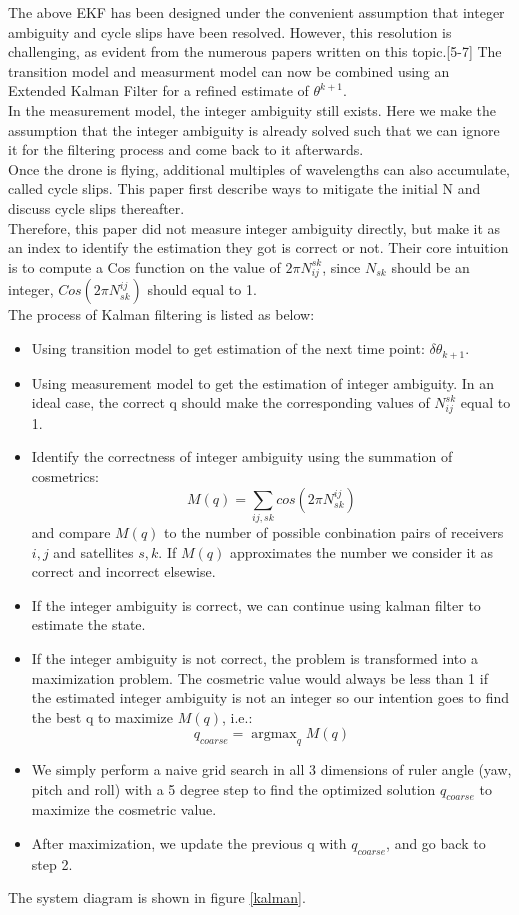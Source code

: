 \documentclass[journal,onecolumn]{IEEEtran}
\DeclareMathOperator*{\argmax}{argmax} %
\begin{document}
The above EKF has been designed under the convenient assumption that integer ambiguity and cycle slips have been resolved.
However, this resolution is challenging, as evident from the numerous papers written on this topic.[5-7]
The transition model and measurment model can now be combined using an
Extended Kalman Filter for a refined estimate of $\theta^{k+1}$.\\
In the measurement model, the integer ambiguity still exists.
Here we make the assumption that the integer ambiguity is already solved
such that we can ignore it for the filtering process and come back to it afterwards.\\
Once the drone is flying, additional multiples of wavelengths can also accumulate,
called cycle slips. This paper first describe ways to mitigate the initial N and
discuss cycle slips thereafter.\\
Therefore, this paper did not measure integer ambiguity directly, but make it as an index
to identify the estimation they got is correct or not. Their core intuition is
to compute a Cos function on the value of $2\pi N_{ij}^{sk}$,
since $N_{sk}$ should be an integer, $Cos(2\pi N_{sk}^{ij})$ should equal to 1.\\
The process of Kalman filtering is listed as below:
\begin{itemize}
\item Using transition model to get estimation of the next time point: $\delta \theta_{k+1}$.
\item Using measurement model to get the estimation of integer ambiguity.
In an ideal case, the correct q should make the corresponding values of $N_{ij}^{sk}$
equal to 1.
\item Identify the correctness of integer ambiguity using the summation of cosmetrics:
\begin{equation}
  M(q) = \sum_{ij,sk} cos(2\pi N_{sk}^{ij})
\end{equation}
and compare $M(q)$ to the number of possible conbination pairs of receivers $i,j$ and
satellites $s,k$. If $M(q)$ approximates the number we consider it as correct and incorrect
elsewise.
\item If the integer ambiguity is correct, we can continue using kalman filter
to estimate the state.
\item If the integer ambiguity is not correct, the problem is transformed into a
maximization problem. The cosmetric value would always be less than 1 if the estimated
integer ambiguity is not an integer so our intention goes to find the best q to maximize
$M(q)$, i.e.:
\begin{equation}
  q_{coarse} = \argmax_q M(q)
\end{equation}
\item We simply perform a naive grid search in all
3 dimensions of ruler angle (yaw, pitch and roll) with a 5 degree step to find the
optimized solution $q_{coarse}$ to maximize the cosmetric value.
\item After maximization, we update the previous q with $q_{coarse}$, and go back to step 2.
\end{itemize}
The system diagram is shown in figure \ref{kalman}.
\end{document}
